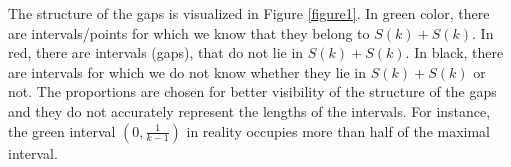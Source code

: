 \documentclass{amsart}
\newtheorem{lemma}[theorem]{Lemma}
\theoremstyle{definition}
\newcommand{\N}{\mathbb N}%
\newcommand{\0}{\mbf 0}%
\def\N{\mathbb N}
\begin{document}









The structure of the gaps is visualized in Figure \ref{figure1}. In green color, there are intervals/points for which we know that they belong to $S(k)+S(k)$. In red, there are intervals (gaps), that do not lie in $S(k)+S(k)$. In black, there are intervals for which we do not know whether they lie in $S(k)+S(k)$ or not. The proportions are chosen for better visibility of the structure of the gaps and they do not accurately represent the lengths of the intervals. For instance, the green interval $(0,\frac{1}{k-1})$ in reality occupies more than half of the maximal interval.
\end{document}
